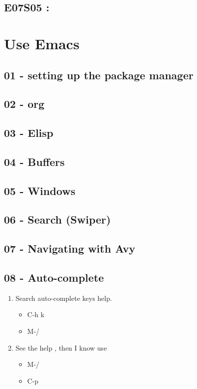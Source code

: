 \documentclass[11pt]{article}
\begin{document}
\subsection{E07S05 :}
\label{sec:org3e36d54}
\section{Use Emacs}
\label{sec:orgaa3c052}
\subsection{01 - setting up the package manager}
\label{sec:orga9f7dfa}
\subsection{02 - org}
\label{sec:org389d5a1}
\subsection{03 - Elisp}
\label{sec:orgc734c21}
\subsection{04 - Buffers}
\label{sec:orgbcad8d9}
\subsection{05 - Windows}
\label{sec:org368fafb}
\subsection{06 - Search (Swiper)}
\label{sec:org1875a14}
\subsection{07 - Navigating with Avy}
\label{sec:org659953a}
\subsection{08 - Auto-complete}
\label{sec:org991fec2}
\begin{enumerate}
\item Search auto-complete keys help. 
\begin{itemize}
\item C-h k
\item M-/
\end{itemize}
\item See the help , then I know use 
\begin{itemize}
\item M-/
\item C-p
\end{itemize}
\end{enumerate}
\end{document}
